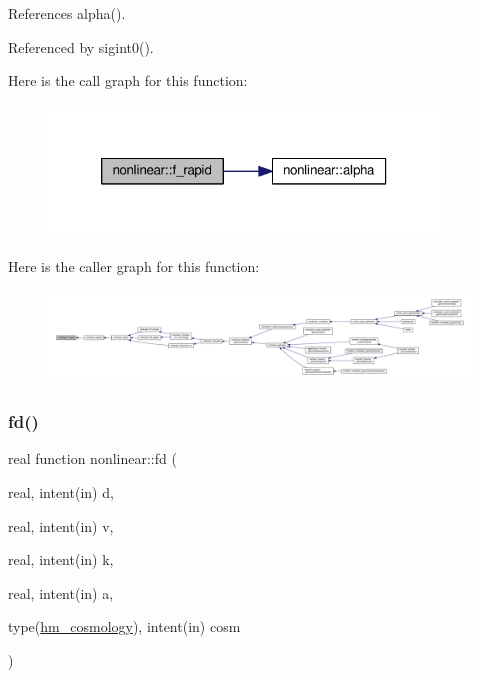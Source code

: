References alpha().



Referenced by sigint0().

Here is the call graph for this function\+:
\nopagebreak
\begin{figure}[H]
\begin{center}
\leavevmode
\includegraphics[width=294pt]{namespacenonlinear_a2a0c300b39b9de3d6b00be6369b59944_cgraph}
\end{center}
\end{figure}
Here is the caller graph for this function\+:
\nopagebreak
\begin{figure}[H]
\begin{center}
\leavevmode
\includegraphics[width=350pt]{namespacenonlinear_a2a0c300b39b9de3d6b00be6369b59944_icgraph}
\end{center}
\end{figure}
\mbox{\label{namespacenonlinear_a7f8c8180d41c0771e383f7edaa516803}} 
\subsubsection{\texorpdfstring{fd()}{fd()}}
{\footnotesize\ttfamily real function nonlinear\+::fd (\begin{DoxyParamCaption}\item[{real, intent(in)}]{d,  }\item[{real, intent(in)}]{v,  }\item[{real, intent(in)}]{k,  }\item[{real, intent(in)}]{a,  }\item[{type(\mbox{\hyperlink{structnonlinear_1_1hm__cosmology}{hm\+\_\+cosmology}}), intent(in)}]{cosm }\end{DoxyParamCaption})\hspace{0.3cm}{\ttfamily [private]}}



